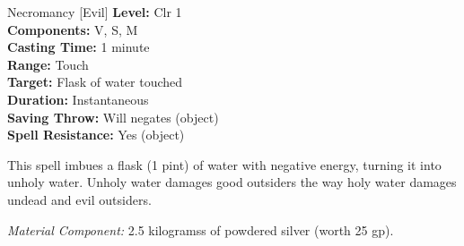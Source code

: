 {Necromancy [Evil]}
{
	\textbf{Level:}
	Clr 1\\
	\textbf{Components:}
	V, S, M\\
	\textbf{Casting Time:}
	1 minute\\
	\textbf{Range:}
	Touch\\
	\textbf{Target:}
	Flask of water touched\\
	\textbf{Duration:}
	Instantaneous\\
	\textbf{Saving Throw:}
	Will negates (object)\\
	\textbf{Spell Resistance:}
	Yes (object)\\
}
{
	This spell imbues a flask (1 pint) of water with negative energy, turning it into unholy water. Unholy water damages good outsiders the way holy water damages undead and evil outsiders.

	\textit{Material Component:}
	2.5 kilogramss of powdered silver (worth 25 gp).

}
